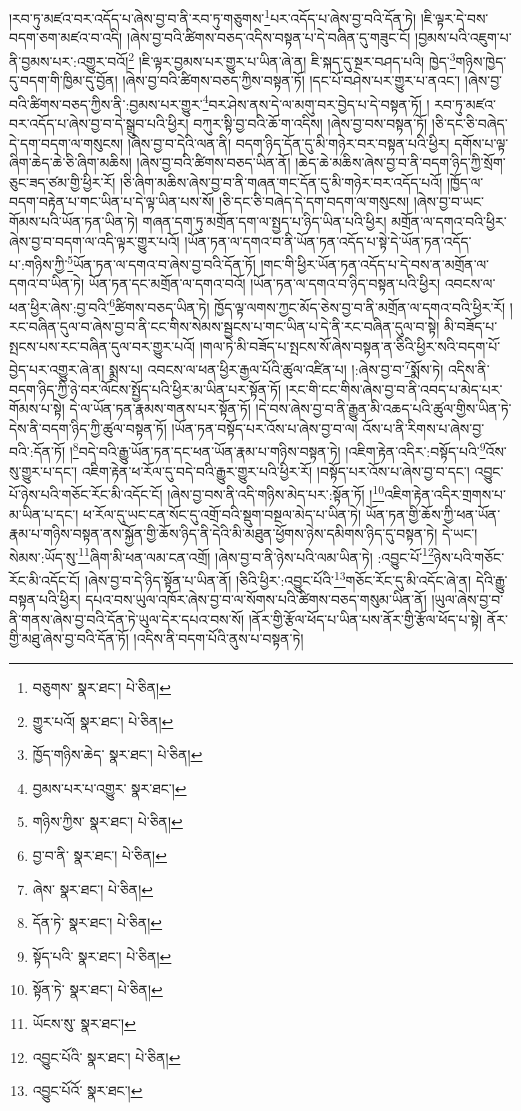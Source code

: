 །རབ་ཏུ་མཛའ་བར་འདོད་པ་ཞེས་བྱ་བ་ནི་རབ་ཏུ་གཅུགས་\footnote{བཅུགས་  སྣར་ཐང་།  པེ་ཅིན། }པར་འདོད་པ་ཞེས་བྱ་བའི་དོན་ཏེ། །ཇི་ལྟར་དེ་བས་བདག་ཅག་མཛའ་བ་འདི། །ཞེས་བྱ་བའི་ཚིགས་བཅད་འདིས་བསྟན་པ་དེ་བཞིན་དུ་གཟུང་ངོ། །བྱམས་པའི་འཇུག་པ་ནི་བྱམས་པར་:འགྱུར་བའོ།\footnote{གྱུར་པའོ།  སྣར་ཐང་།  པེ་ཅིན། } །ཇི་ལྟར་བྱམས་པར་གྱུར་པ་ཡིན་ཞེ་ན། ཇི་སྐད་དུ་སྔར་བཤད་པའི། ཁྱེད་\footnote{ཁྱོད་གཉིས་ཆེད་  སྣར་ཐང་།  པེ་ཅིན། }གཉིས་ཁྱེད་དུ་བདག་གི་ཁྱིམ་དུ་བྱོན། །ཞེས་བྱ་བའི་ཚིགས་བཅད་ཀྱིས་བསྟན་ཏོ། །དང་པོ་བཤེས་པར་གྱུར་པ་ནའང་། །ཞེས་བྱ་བའི་ཚིགས་བཅད་ཀྱིས་ནི་:བྱམས་པར་གྱུར་\footnote{བྱམས་པར་པ་འགྱུར་  སྣར་ཐང་། }བར་ཤེས་ནས་དེ་ལ་མགུ་བར་བྱེད་པ་དེ་བསྟན་ཏོ། །
རབ་ཏུ་མཛའ་བར་འདོད་པ་ཞེས་བྱ་བ་དེ་སྒྲུབ་པའི་ཕྱིར། བཀུར་སྟི་བྱ་བའི་ཆོ་ག་འདིས། །ཞེས་བྱ་བས་བསྟན་ཏོ། །ཅི་དང་ཅི་བཞེད་དེ་དག་བདག་ལ་གསུངས། །ཞེས་བྱ་བ་དེའི་ལན་ནི། བདག་ཉིད་དོན་དུ་མི་གཉེར་བར་བསྟན་པའི་ཕྱིར། དགོས་པ་ལྟ་ཞིག་ཆེད་ཆེ་ཅི་ཞིག་མཆིས། །ཞེས་བྱ་བའི་ཚིགས་བཅད་ཡིན་ནོ། །ཆེད་ཆེ་མཆིས་ཞེས་བྱ་བ་ནི་བདག་ཉིད་ཀྱི་སྲོག་ཅུང་ཟད་ཙམ་གྱི་ཕྱིར་རོ། །ཅི་ཞིག་མཆིས་ཞེས་བྱ་བ་ནི་གཞན་གང་དོན་དུ་མི་གཉེར་བར་འདོད་པའོ། །ཁྱོད་ལ་བདག་བརྟེན་པ་གང་ཡིན་པ་དེ་ལྟ་ཡིན་པས་སོ། །ཅི་དང་ཅི་བཞེད་དེ་དག་བདག་ལ་གསུངས། །ཞེས་བྱ་བ་ཡང་གོམས་པའི་ཡོན་ཏན་ཡིན་ཏེ། གཞན་དག་ཏུ་མགྲོན་དག་ལ་སྤྱད་པ་ཉིད་ཡིན་པའི་ཕྱིར། མགྲོན་ལ་དགའ་བའི་ཕྱིར་ཞེས་བྱ་བ་བདག་ལ་འདི་ལྟར་གྱུར་པའོ། །ཡོན་ཏན་ལ་དགའ་བ་ནི་ཡོན་ཏན་འདོད་པ་སྟེ་དེ་ཡོན་ཏན་འདོད་པ་:གཉིས་ཀྱི་\footnote{གཉིས་ཀྱིས་  སྣར་ཐང་།  པེ་ཅིན། }ཡོན་ཏན་ལ་དགའ་བ་ཞེས་བྱ་བའི་དོན་ཏོ། །གང་གི་ཕྱིར་ཡོན་ཏན་འདོད་པ་དེ་བས་ན་མགྲོན་ལ་དགའ་བ་ཡིན་ཏེ། ཡོན་ཏན་དང་མགྲོན་ལ་དགའ་བའོ། །ཡོན་ཏན་ལ་དགའ་བ་ཉིད་བསྟན་པའི་ཕྱིར། འབངས་ལ་ཕན་ཕྱིར་ཞེས་:བྱ་བའི་\footnote{བྱ་བ་ནི་  སྣར་ཐང་།  པེ་ཅིན། }ཚིགས་བཅད་ཡིན་ཏེ། ཁྱོད་ལྟ་ལགས་ཀྱང་མོད་ཅེས་བྱ་བ་ནི་མགྲོན་ལ་དགའ་བའི་ཕྱིར་རོ། །རང་བཞིན་དུལ་བ་ཞེས་བྱ་བ་ནི་ངང་གིས་སེམས་སྦྱངས་པ་གང་ཡིན་པ་དེ་ནི་རང་བཞིན་དུལ་བ་སྟེ། མི་བཟོད་པ་སྤངས་པས་རང་བཞིན་དུལ་བར་གྱུར་པའོ། །གལ་ཏེ་མི་བཟོད་པ་སྤངས་སོ་ཞེས་བསྟན་ན་ཅིའི་ཕྱིར་སའི་བདག་པོ་བྱེད་པར་འགྱུར་ཞེ་ན། སྨྲས་པ། འབངས་ལ་ཕན་ཕྱིར་རྒྱལ་པོའི་ཚུལ་འཛིན་པ། །:ཞེས་བྱ་བ་\footnote{ཞེས་  སྣར་ཐང་།  པེ་ཅིན། }སྨོས་ཏེ། འདིས་ནི་བདག་ཉིད་ཀྱི་ཉེ་བར་ལོངས་སྤྱོད་པའི་ཕྱིར་མ་ཡིན་པར་སྟོན་ཏོ། །རང་གི་ངང་གིས་ཞེས་བྱ་བ་ནི་འབད་པ་མེད་པར་གོམས་པ་སྟེ། དེ་ལ་ཡོན་ཏན་རྣམས་གནས་པར་སྟོན་ཏོ། །དེ་བས་ཞེས་བྱ་བ་ནི་རྒྱུན་མི་འཆད་པའི་ཚུལ་གྱིས་ཡིན་ཏེ་དེས་ནི་བདག་ཉིད་ཀྱི་ཚུལ་བསྟན་ཏོ། །ཡོན་ཏན་བསྟོད་པར་འོས་པ་ཞེས་བྱ་བ་ལ། འོས་པ་ནི་རིགས་པ་ཞེས་བྱ་བའི་:དོན་ཏོ། །\footnote{དོན་ཏེ་  སྣར་ཐང་།  པེ་ཅིན། }བདེ་བའི་རྒྱུ་ཡོན་ཏན་དང་ཕན་ཡོན་རྣམ་པ་གཉིས་བསྟན་ཏེ། །འཇིག་རྟེན་འདིར་:བསྟོད་པའི་\footnote{སྟོད་པའི་  སྣར་ཐང་།  པེ་ཅིན། }འོས་སུ་གྱུར་པ་དང་། འཇིག་རྟེན་ཕ་རོལ་དུ་བདེ་བའི་རྒྱུར་གྱུར་པའི་ཕྱིར་རོ། །བསྟོད་པར་འོས་པ་ཞེས་བྱ་བ་དང་། འབྱུང་པོ་ཉེས་པའི་གཅོང་རོང་མི་འདོང་ངོ། །ཞེས་བྱ་བས་ནི་འདི་གཉིས་མེད་པར་:སྟོན་ཏོ། །\footnote{སྟོན་ཏེ་  སྣར་ཐང་།  པེ་ཅིན། }འཇིག་རྟེན་འདིར་གྲགས་པ་མ་ཡིན་པ་དང་། ཕ་རོལ་དུ་ཡང་ངན་སོང་དུ་འགྲོ་བའི་སྡུག་བསྔལ་མེད་པ་ཡིན་ཏེ། ཡོན་ཏན་གྱི་ཆོས་ཀྱི་ཕན་ཡོན་རྣམ་པ་གཉིས་བསྟན་ནས་སྐྱོན་གྱི་ཆོས་ཉིད་ནི་དེའི་མི་མཐུན་ཕྱོགས་ཉེས་དམིགས་ཉིད་དུ་བསྟན་ཏེ། དེ་ཡང་། སེམས་:ཡོད་སུ་\footnote{ཡོངས་སུ་  སྣར་ཐང་། }ཞིག་མི་ཕན་ལམ་ངན་འགྲོ། །ཞེས་བྱ་བ་ནི་ཉེས་པའི་ལམ་ཡིན་ཏེ། :འབྱུང་པོ་\footnote{འབྱུང་པོའི་  སྣར་ཐང་།  པེ་ཅིན། }ཉེས་པའི་གཅོང་རོང་མི་འདོང་ངོ། །ཞེས་བྱ་བ་དེ་ཉིད་སྟོན་པ་ཡིན་ནོ། །ཅིའི་ཕྱིར་:འབྱུང་པོའི་\footnote{འབྱུང་པོའོ་  སྣར་ཐང་། }གཅོང་རོང་དུ་མི་འདོང་ཞེ་ན། དེའི་རྒྱུ་བསྟན་པའི་ཕྱིར། དཔའ་བས་ཡུལ་འཁོར་ཞེས་བྱ་བ་ལ་སོགས་པའི་ཚིགས་བཅད་གསུམ་ཡིན་ནོ། །ཡུལ་ཞེས་བྱ་བ་ནི་གནས་ཞེས་བྱ་བའི་དོན་ཏེ་ཡུལ་དེར་དཔའ་བས་སོ། །ནོར་གྱི་རྩོལ་ཕོད་པ་ཡིན་པས་ནོར་གྱི་རྩོལ་ཕོད་པ་སྟེ། ནོར་གྱི་མཐུ་ཞེས་བྱ་བའི་དོན་ཏོ། །འདིས་ནི་བདག་པོའི་ནུས་པ་བསྟན་ཏེ། 